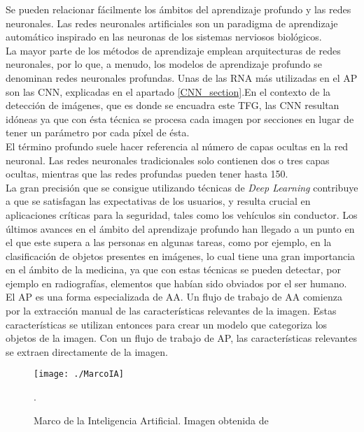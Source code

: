 \documentclass[a4paper, 12pt, spanish, chapterprefix, numbers=noenddot]{book}
\begin{document}
Se pueden relacionar fácilmente los ámbitos del aprendizaje profundo y las redes neuronales. Las redes neuronales artificiales son un paradigma de aprendizaje automático inspirado en las neuronas de los sistemas nerviosos biológicos.\\

La mayor parte de los métodos de aprendizaje emplean arquitecturas de redes neuronales, por lo que, a menudo, los modelos de aprendizaje profundo se denominan redes neuronales profundas. Unas de las RNA más utilizadas en el AP son las CNN, explicadas en el apartado \ref{CNN_section}.En el contexto de la detección de imágenes, que es donde se encuadra este TFG, las CNN resultan idóneas ya que con ésta técnica se procesa cada imagen por secciones en lugar de tener un parámetro por cada píxel de ésta.\\

El término profundo suele hacer referencia al número de capas ocultas en la red neuronal. Las redes neuronales tradicionales solo contienen dos o tres capas ocultas, mientras que las redes profundas pueden tener hasta 150.\\

La gran precisión que se consigue utilizando técnicas de \textit{Deep Learning} contribuye a que se satisfagan las expectativas de los usuarios, y resulta crucial en aplicaciones críticas para la seguridad, tales como los vehículos sin conductor. Los últimos avances en el ámbito del aprendizaje profundo han llegado a un punto en el que este supera a las personas en algunas tareas, como por ejemplo, en la clasificación de objetos presentes en imágenes, lo cual tiene una gran importancia en el ámbito de la medicina, ya que con estas técnicas se pueden detectar, por ejemplo en radiografías, elementos que habían sido obviados por el ser humano.\\

El AP es una forma especializada de AA. Un flujo de trabajo de AA comienza por la extracción manual de las características relevantes de la imagen. Estas características se utilizan entonces para crear un modelo que categoriza los objetos de la imagen. Con un flujo de trabajo de AP, las características relevantes se extraen directamente de la imagen.\\

\begin{figure}[H]
\begin{center}
\texttt{[image: ./MarcoIA]}
\caption{Marco de la Inteligencia Artificial. Imagen obtenida de \cite{MachineLearning&DeepLearning}}.
\label{MArcoIA}
\end{center}
\end{figure}
\end{document}
